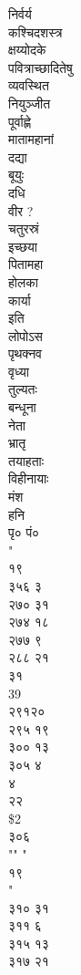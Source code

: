\documentclass[11pt, openany]{book}
\begin{document}
{{{{{{{{{{{{{{{{{{{{{{{{{{{{{{{{{{{{{{{{{{{{{{{{{{{{{{{{{{{{{{{{{{{{{{{{{{{{{{{{{{{{{{{{{{{{{{{{{{{{{{{{{{{{{{{{{{{{{{{{{{{{{{{{{{{{{{{{{{{{{{{{{{{{{{{{{{{{{{{{{{{{{{{{{{निर्वर्य\\
कश्चिदशस्त्र\\
क्षय्योदके\\
पवित्राच्छादितेषु\\
व्यवस्थित\\
नियुञ्जीत\\
पूर्वाह्णे\\
मातामहानां\\
दद्या\\
बूयुः\\
दधि\\
वीर ?\\
चतुरस्रं\\
इच्छया\\
पितामहा\\
होलका\\
कार्या\\
}{इति}{\\
लोपोऽस\\
पृथक्नव\\
वृध्या\\
तुल्यतः\\
बन्धूना\\
नेता\\
भ्रातृ\\
तयाहताः\\
विहीनायाः\\
मंश\\
हनि\\
पृ० पं०\\
"\\
१९\\
३५६ ३\\
२७० ३१\\
२७४ १८\\
२७७ ९\\
२८८ २१\\
३१\\
39\\
२९१२०\\
२९५ १९\\
३०० १३\\
३०५ ४\\
४\\
२२\\
\$2\\
३०६\\
"" "\\
१९\\
"\\
३१० ३१\\
३११ ६\\
३१५ १३\\
३१७ २१\\
}}}}}}}}}}}}}}}}}}}}}}}}}}}}}}}}}}}}}}}}}}}}}}}}}}}}}}}}}}}}}}}}}}}}}}}}}}}}}}}}}}}}}}}}}}}}}}}}}}}}}}}}}}}}}}}}}}}}}}}}}}}}}}}}}}}}}}}}}}}}}}}}}}}}}}}}}}}}}}}}}}}}}}}}}}
\end{document}
